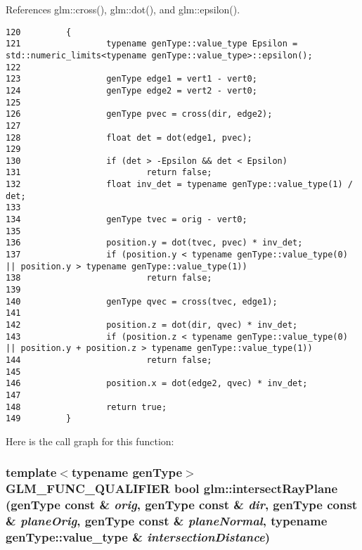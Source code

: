 References glm::cross(), glm::dot(), and glm::epsilon().

\begin{Code}\begin{verbatim}120         {
121                 typename genType::value_type Epsilon = std::numeric_limits<typename genType::value_type>::epsilon();
122 
123                 genType edge1 = vert1 - vert0;
124                 genType edge2 = vert2 - vert0;
125 
126                 genType pvec = cross(dir, edge2);
127 
128                 float det = dot(edge1, pvec);
129 
130                 if (det > -Epsilon && det < Epsilon)
131                         return false;
132                 float inv_det = typename genType::value_type(1) / det;
133 
134                 genType tvec = orig - vert0;
135 
136                 position.y = dot(tvec, pvec) * inv_det;
137                 if (position.y < typename genType::value_type(0) || position.y > typename genType::value_type(1))
138                         return false;
139 
140                 genType qvec = cross(tvec, edge1);
141 
142                 position.z = dot(dir, qvec) * inv_det;
143                 if (position.z < typename genType::value_type(0) || position.y + position.z > typename genType::value_type(1))
144                         return false;
145 
146                 position.x = dot(edge2, qvec) * inv_det;
147 
148                 return true;
149         }
\end{verbatim}
\end{Code}




Here is the call graph for this function:\hypertarget{group__gtx__intersect_g1699af184f5244ebe224fd653dd0bfc0}{
\subsubsection[intersectRayPlane]{\setlength{\rightskip}{0pt plus 5cm}template$<$typename genType$>$ GLM\_\-FUNC\_\-QUALIFIER bool glm::intersectRayPlane (genType const \& {\em orig}, \/  genType const \& {\em dir}, \/  genType const \& {\em planeOrig}, \/  genType const \& {\em planeNormal}, \/  typename genType::value\_\-type \& {\em intersectionDistance})}}
\label{group__gtx__intersect_g1699af184f5244ebe224fd653dd0bfc0}


